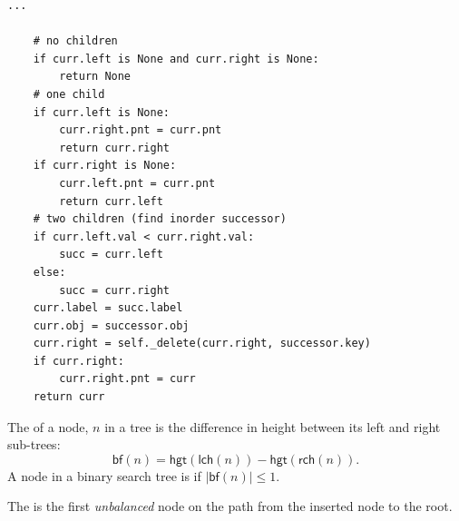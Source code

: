 \documentclass[mathserif, handout]{beamer}
\begin{document}
\begin{frame}[fragile]
\vspace{-5mm}
\begin{thmbox}
\begin{lstlisting}[style=mypython]
    ...
    
    # no children
    if curr.left is None and curr.right is None:
        return None
    # one child
    if curr.left is None:
        curr.right.pnt = curr.pnt
        return curr.right
    if curr.right is None:
        curr.left.pnt = curr.pnt
        return curr.left
    # two children (find inorder successor)
    if curr.left.val < curr.right.val:
        succ = curr.left
    else:
        succ = curr.right
    curr.label = succ.label
    curr.obj = successor.obj
    curr.right = self._delete(curr.right, successor.key)
    if curr.right:
        curr.right.pnt = curr
    return curr
\end{lstlisting}
\end{thmbox}
\end{frame}

\begin{frame}
\begin{thmbox}
The  of a node, $n$ in a tree is the difference in height between its left and right sub-trees:
\[\textsf{bf}(n) = \textsf{hgt}(\textsf{lch}(n)) - \textsf{hgt}(\textsf{rch}(n)).\]
A node in a binary search tree is  if $|\textsf{bf}(n)| \leq 1$.
\end{thmbox}

\begin{thmbox}
The  is the first \textit{unbalanced} node on the path from the inserted node to the root. 
\end{thmbox}

\renewcommand\thefootnote{}
    
\end{frame}
\end{document}

